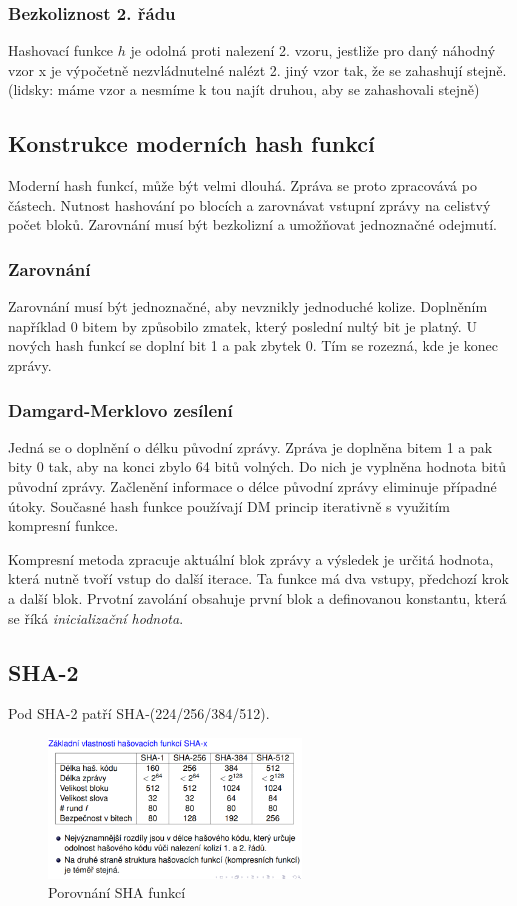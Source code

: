 \documentclass{szzclass}
\begin{document}
\subsubsection{Bezkoliznost 2. řádu}
Hashovací funkce $h$ je odolná proti nalezení 2. vzoru, jestliže pro daný náhodný vzor x je výpočetně nezvládnutelné nalézt 2. jiný vzor tak, že se
zahashují stejně. (lidsky: máme vzor a nesmíme k tou najít druhou, aby se zahashovali stejně)
\subsection{Konstrukce moderních hash funkcí}
Moderní hash funkcí, může být velmi dlouhá. Zpráva se proto zpracovává po částech. Nutnost hashování po blocích a zarovnávat vstupní zprávy na celistvý počet bloků.
Zarovnání musí být bezkolizní a umožňovat jednoznačné odejmutí.
\subsubsection{Zarovnání}
Zarovnání musí být jednoznačné, aby nevznikly jednoduché kolize. Doplněním například 0 bitem by způsobilo zmatek, který poslední nultý bit je platný.
U nových hash funkcí se doplní bit 1 a pak zbytek 0. Tím se rozezná, kde je konec zprávy.
\subsubsection{Damgard-Merklovo zesílení}
Jedná se o doplnění o délku původní zprávy. Zpráva je doplněna bitem 1 a pak bity 0 tak, aby na konci zbylo 64 bitů volných. Do nich je vyplněna hodnota
 bitů původní zprávy. Začlenění informace o délce původní zprávy eliminuje případné útoky. Současné hash funkce používají DM princip iterativně s využitím kompresní funkce.

Kompresní metoda zpracuje aktuální blok zprávy a výsledek je určitá hodnota, která nutně tvoří vstup do další iterace. Ta funkce má dva vstupy, předchozí krok a další blok.
Prvotní zavolání obsahuje první blok a definovanou konstantu, která se říká \textit{inicializační hodnota}.

\subsection{SHA-2}
Pod SHA-2 patří SHA-(224/256/384/512).

\begin{figure}[h!]
    \centering
    \includegraphics[width=0.6\textwidth]{topics/bi-spol-06/image/shaCompare.png}
    \caption{Porovnání SHA funkcí}
\end{figure}
\end{document}

